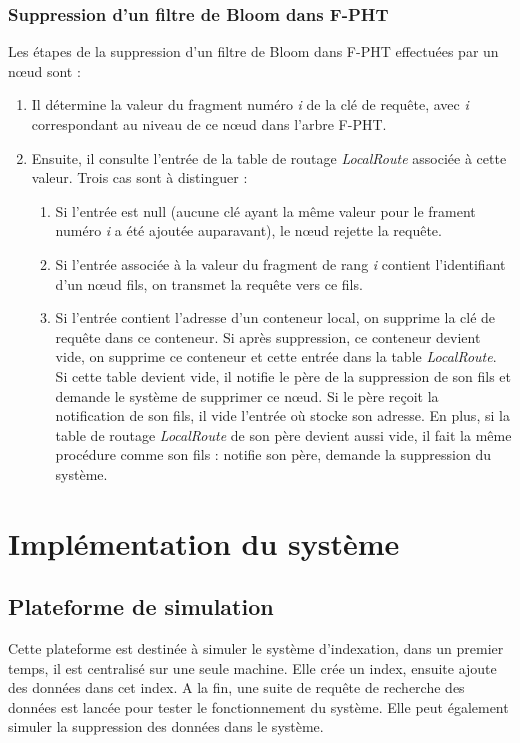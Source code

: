 \documentclass[a4paper,11pt]{report}
\begin{document}
\subsection{Suppression d'un filtre de Bloom dans F-PHT}
	Les étapes de la suppression d'un filtre de Bloom dans F-PHT effectuées par un nœud sont :
	\begin{enumerate}
		\item Il détermine la valeur du fragment numéro \textit{i} de la clé de requête, avec \textit{i} correspondant au niveau de ce nœud dans l'arbre F-PHT.
		\item Ensuite, il consulte l'entrée de la table de routage \textit{LocalRoute} associée à cette valeur. Trois cas sont à distinguer :
		\begin{enumerate}
			\item Si l'entrée est null (aucune clé ayant la même valeur pour le frament numéro \textit{i} a été ajoutée auparavant), le nœud rejette la requête.
			\item Si l'entrée associée à la valeur du fragment de rang \textit{i} contient l'identifiant d'un nœud fils, on transmet la requête vers ce fils.
			\item Si l'entrée contient l'adresse d'un conteneur local, on supprime la clé de requête dans ce conteneur. Si après suppression, ce conteneur devient vide, on supprime ce conteneur et cette entrée dans la table \textit{LocalRoute}. Si cette table devient vide, il notifie le père de la suppression de son fils et demande le système de supprimer ce nœud. Si le père reçoit la notification de son fils, il vide l'entrée où stocke son adresse. En plus, si la table de routage \textit{LocalRoute} de son père devient aussi vide, il fait la même procédure comme son fils : notifie son père, demande la suppression du système.
		\end{enumerate}
	\end{enumerate}

\chapter{Implémentation du système}
\section{Plateforme de simulation}
	Cette plateforme est destinée à simuler le système d'indexation, dans un premier temps, il est centralisé sur une seule machine. Elle crée un index, ensuite ajoute des données dans cet index. A la fin, une suite de requête de recherche des données est lancée pour tester le fonctionnement du système. Elle peut également simuler la suppression des données dans le système.
	
\end{document}
